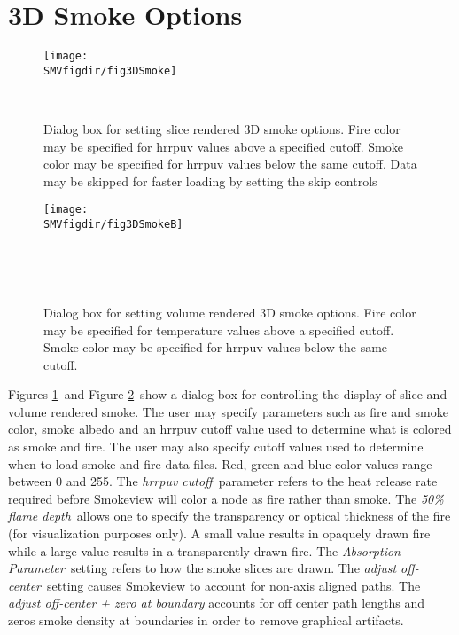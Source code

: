 \documentclass[11pt,twoside]{book}
\begin{document}
\section{3D Smoke Options}
\begin{figure}[bph]
\centerline{\texttt{[image: \\SMVfigdir/fig3DSmoke]}
}\ \caption[Dialog box for setting slice rendered 3D smoke options]
{Dialog box for setting slice rendered 3D smoke options.  Fire color may be specified for hrrpuv values above a specified cutoff.
Smoke color may be specified for hrrpuv values below the same cutoff. Data may be skipped for faster loading by setting the skip controls }
\label{fig3DSmoke}
\end{figure}
\begin{figure}[bph]
\centerline{\texttt{[image: \\SMVfigdir/fig3DSmokeB]}
}\ \caption[Dialog box for setting volume rendered 3D smoke
options] {Dialog box for setting volume rendered 3D smoke options.
Fire color may be specified for temperature values above a specified cutoff.
Smoke color may be specified for hrrpuv values below the same cutoff.
}\ \label{fig3DSmokeB}
\end{figure}
Figures \ref{fig3DSmoke}\ and Figure \ref{fig3DSmokeB}\ show a dialog box for controlling the display of
slice and volume rendered smoke.
The user may specify parameters such as fire and smoke color, smoke albedo and an hrrpuv cutoff value used
to determine what is colored as smoke and fire.  The user may also specify cutoff values used to determine when to load smoke
and fire data files.
Red, green and blue color values range between 0 and 255.
The {\em hrrpuv cutoff}\ parameter refers to
the heat release rate required before Smokeview will
color a node as fire rather than smoke. The {\em 50\% flame
depth}\ allows one to specify the transparency or optical thickness
of the fire (for visualization purposes only). A small value
results in opaquely drawn fire while a large value results in a
transparently drawn fire. The {\em Absorption Parameter}\ setting
refers to how the smoke slices are drawn.  The {\em adjust
off-center}\ setting causes Smokeview to account for non-axis
aligned paths. The {\em adjust off-center + zero at boundary}
accounts for off center path lengths and zeros smoke density at
boundaries in order to remove graphical artifacts.
\end{document}
